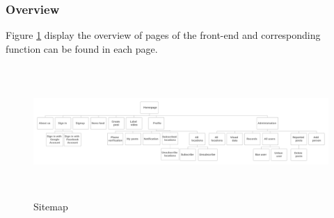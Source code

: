 \subsubsection{Overview}
Figure \ref{chap4:sitemap} display the overview of pages of the front-end and corresponding function can be found in each page.
\begin{center}
    \begin{figure}[H]
    \centering
    \includegraphics[width=17cm,height=5cm]{images/chap4/sitemap-edit2.png}
    \caption{Sitemap}
    \label{chap4:sitemap}
    \end{figure}
\end{center}
